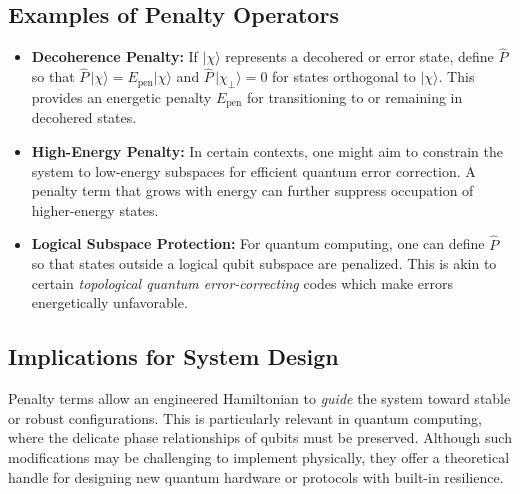 \documentclass[11pt]{article}
\begin{document}
\subsection{Examples of Penalty Operators}
\begin{itemize}
    \item \textbf{Decoherence Penalty:} If $\vert \chi\rangle$ represents a decohered or error state, define $\hat{P}$ so that $\hat{P}\,\vert\chi\rangle = E_{\mathrm{pen}}\vert\chi\rangle$ and $\hat{P}\,\vert\chi_\perp\rangle = 0$ for states orthogonal to $\vert\chi\rangle$. This provides an energetic penalty $E_{\mathrm{pen}}$ for transitioning to or remaining in decohered states.
    \item \textbf{High-Energy Penalty:} In certain contexts, one might aim to constrain the system to low-energy subspaces for efficient quantum error correction. A penalty term that grows with energy can further suppress occupation of higher-energy states.
    \item \textbf{Logical Subspace Protection:} For quantum computing, one can define $\hat{P}$ so that states outside a logical qubit subspace are penalized. This is akin to certain \emph{topological quantum error-correcting} codes which make errors energetically unfavorable.
\end{itemize}

\subsection{Implications for System Design}
Penalty terms allow an engineered Hamiltonian to \emph{guide} the system toward stable or robust configurations. This is particularly relevant in quantum computing, where the delicate phase relationships of qubits must be preserved. Although such modifications may be challenging to implement physically, they offer a theoretical handle for designing new quantum hardware or protocols with built-in resilience. 
\end{document}

